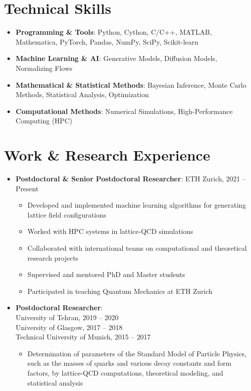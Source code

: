 \documentclass[a4paper,10pt]{article}
\begin{document}
\section*{Technical Skills}
\begin{itemize}
\item \textbf{Programming \& Tools}: Python, Cython, C/C++, MATLAB, Mathematica, PyTorch, Pandas, NumPy, SciPy, Scikit-learn
\item \textbf{Machine Learning \& AI}: Generative Models, Diffusion Models, Normalizing Flows
\item \textbf{Mathematical \& Statistical Methods}: Bayesian Inference, Monte Carlo Methods, Statistical Analysis, Optimization
\item \textbf{Computational Methods}: Numerical Simulations, High-Performance Computing (HPC)
\end{itemize}

\section*{Work \& Research Experience}

\begin{itemize}

\item
\textbf{Postdoctoral \& Senior Postdoctoral Researcher}:  ETH Zurich, 2021 -- Present

\begin{itemize}
\item Developed and implemented machine learning algorithms for generating lattice field configurations
\item Worked with HPC systems in lattice-QCD simulations
\item Collaborated with international teams on computational and theoretical research projects
\item Supervised and mentored PhD and Master students
\item Participated in teaching Quantum Mechanics at ETH Zurich
\end{itemize}

\item
\textbf{Postdoctoral Researcher}:\\
University of Tehran, 2019 -- 2020\\
University of Glasgow, 2017 -- 2018\\
Technical University of Munich, 2015 -- 2017

\begin{itemize}
\item Determination of parameters of the Standard Model of Particle Physics, such as the masses of quarks and various decay constants and form factors, by lattice-QCD computations, theoretical modeling, and statistical analysis
\end{itemize}

\end{itemize}
\end{document}
